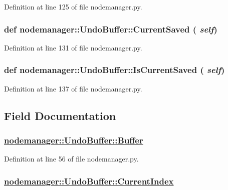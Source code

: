 Definition at line 125 of file nodemanager.py.\hypertarget{classnodemanager_1_1UndoBuffer_351f7c0312c72b4fd49b34e56e6449f1}{
\subsubsection[CurrentSaved]{\setlength{\rightskip}{0pt plus 5cm}def nodemanager::Undo\-Buffer::Current\-Saved ( {\em self})}}
\label{classnodemanager_1_1UndoBuffer_351f7c0312c72b4fd49b34e56e6449f1}




Definition at line 131 of file nodemanager.py.\hypertarget{classnodemanager_1_1UndoBuffer_8d3fd5b2285366f941cc02489a16ea32}{
\subsubsection[IsCurrentSaved]{\setlength{\rightskip}{0pt plus 5cm}def nodemanager::Undo\-Buffer::Is\-Current\-Saved ( {\em self})}}
\label{classnodemanager_1_1UndoBuffer_8d3fd5b2285366f941cc02489a16ea32}




Definition at line 137 of file nodemanager.py.

\subsection{Field Documentation}
\hypertarget{classnodemanager_1_1UndoBuffer_7519445d4c5da6ace730aef461bb5ff4}{
\subsubsection[Buffer]{\setlength{\rightskip}{0pt plus 5cm}\hyperlink{classnodemanager_1_1UndoBuffer_7519445d4c5da6ace730aef461bb5ff4}{nodemanager::Undo\-Buffer::Buffer}}}
\label{classnodemanager_1_1UndoBuffer_7519445d4c5da6ace730aef461bb5ff4}




Definition at line 56 of file nodemanager.py.\hypertarget{classnodemanager_1_1UndoBuffer_ac3ba6b2edb998e1d3c2c3ca5163b200}{
\subsubsection[CurrentIndex]{\setlength{\rightskip}{0pt plus 5cm}\hyperlink{classnodemanager_1_1UndoBuffer_ac3ba6b2edb998e1d3c2c3ca5163b200}{nodemanager::Undo\-Buffer::Current\-Index}}}
\label{classnodemanager_1_1UndoBuffer_ac3ba6b2edb998e1d3c2c3ca5163b200}




